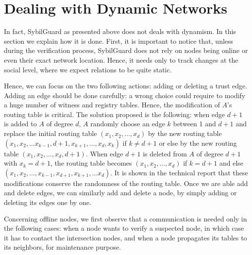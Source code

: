 \documentclass[a4paper,11pt]{article}
\begin{document}
\section{Dealing with Dynamic Networks}

In fact, SybilGuard as presented above does not deals with dynamism.
In this section we explain how it is done. First, it is important to
notice that, unless during the verification process, SybilGuard does not
rely on nodes being online or even their exact network
location. Hence, it needs only to track changes at the social level,
where we expect relations to be quite static.


Hence, we can focus on the two following actions: adding or deleting a
trust edge. Adding an edge should be done carefully: a wrong choice
could require to modify a huge number of witness and registry tables.
Hence, the modification of $A$'s routing table is critical. The
solution proposed is the following: when edge $d+1$ is added to $A$ of
degree $d$, $A$ randomly choose an edge $k$ between 1 and $d+1$ and
replace the initial routing table $(x_1,x_2,\dots, x_d)$ by the new
routing table $(x_1,x_2,\dots x_{k-1},d+1,x_{k+1},\dots, x_d, x_k)$ if
$k\neq d+1$ or else by the new routing table $(x_1,x_2,\dots
,x_d,d+1)$.  When edge $d+1$ is deleted from $A$ of degree $d+1$ with
$x_k=d+1$, the routing table becomes $(x_1,x_2,\dots, x_d)$ if $k=d+1$
and else $(x_1,x_2,\dots, x_{k-1}, x_{d+1}, x_{k+1},\dots x_d)$. It is
shown in the technical report that these modifications conserve the
randomness of the routing table. Once we are able add and delete
edges, we can similarly add and delete a node, by simply adding or
deleting its edges one by one.


Concerning offline nodes, we first observe that a communication is
needed only in the following cases: when a node wants to verify a
suspected node, in which case it has to contact the intersection
nodes, and when a node propagates its tables to its neighbors, for
maintenance purpose.
\end{document}
